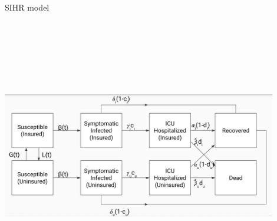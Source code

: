\documentclass[notes]{beamer}
\begin{document}
\begin{frame}{SIHR model}


\includegraphics[width=12cm,height=12cm,keepaspectratio]{model_flow.png}






\end{frame}
\end{document}
